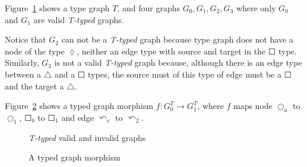 \begin{example} Figure~\ref{fig:gts:typed-graphs} shows a type graph $T$, and four graphs $G_0, G_1, G_2, G_3$ where only $G_0$ and $G_1$ are valid \emph{T-typed} graphs. 
  
  Notice that $G_2$ can not be a \emph{T-typed} graph because type graph does not have a node of the type $\lozenge$, neither an edge type with source and target in the $\Square$ type. Similarly, $G_3$ is not a valid \emph{T-typed} graph because, although there is an edge type between a $\triangle$ and a $\Square$ types, the source must of this type of edge must be a $\Square$ and the target a $\triangle$.

  Figure~\ref{fig:gts:typed-graph-morphism} shows a typed graph morphism $f : G_0^T \rightarrow G_1^T$, where $f$ maps node $\Circle_a$ to $\Circle_1$, $\Square_b$ to $\Square_1$ and edge $\curvearrowleft_e$ to $\curvearrowleft_2$.
\begin{figure}[!ht]
  \centering
  \caption{\emph{T-typed} valid and invalid graphs}\label{fig:gts:typed-graphs}
\end{figure}

\begin{figure}[!ht]
  \centering
  \caption{A typed graph morphism}\label{fig:gts:typed-graph-morphism}
\end{figure}
\end{example}

